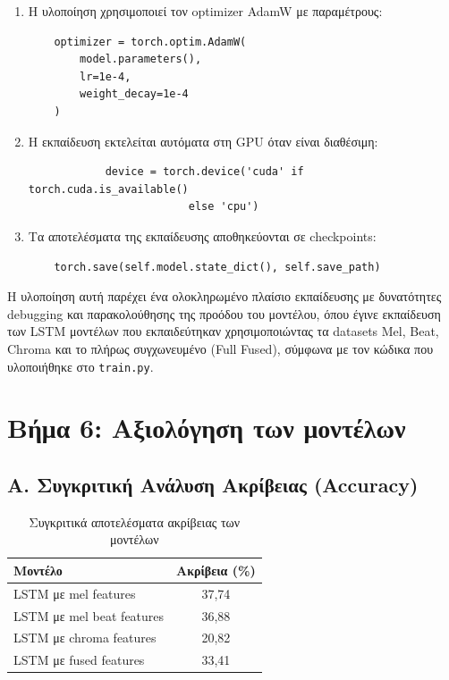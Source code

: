 \documentclass[a4paper,12pt]{article}
\begin{document}
\begin{enumerate}
    \item Η υλοποίηση χρησιμοποιεί τον optimizer AdamW με παραμέτρους:
          \begin{verbatim}
    optimizer = torch.optim.AdamW(
        model.parameters(), 
        lr=1e-4, 
        weight_decay=1e-4
    )
    \end{verbatim}

    \item Η εκπαίδευση εκτελείται αυτόματα στη GPU όταν είναι διαθέσιμη:
    \begin{verbatim}
            device = torch.device('cuda' if torch.cuda.is_available() 
                         else 'cpu')
    \end{verbatim}

    \item Τα αποτελέσματα της εκπαίδευσης αποθηκεύονται σε checkpoints:
          \begin{verbatim}
    torch.save(self.model.state_dict(), self.save_path)
    \end{verbatim}
\end{enumerate}

Η υλοποίηση αυτή παρέχει ένα ολοκληρωμένο πλαίσιο εκπαίδευσης με δυνατότητες debugging και παρακολούθησης της προόδου του μοντέλου,
όπου έγινε εκπαίδευση των LSTM μοντέλων που εκπαιδεύτηκαν χρησιμοποιώντας τα datasets Mel, Beat, Chroma και το πλήρως συγχωνευμένο (Full Fused), σύμφωνα με τον κώδικα που υλοποιήθηκε στο \verb|train.py|.

\section*{Βήμα 6: Αξιολόγηση των μοντέλων}

\subsection*{Α. Συγκριτική Ανάλυση Ακρίβειας (Accuracy)}

\begin{table}[H]
    \centering
    \begin{tabular}{lc}
    \toprule
    \textbf{Μοντέλο} & \textbf{Ακρίβεια (\%)} \\
    \midrule
    LSTM με mel features & 37,74 \\
    LSTM με mel beat features & 36,88 \\
    LSTM με chroma features & 20,82 \\
    LSTM με fused features & 33,41 \\
    \bottomrule
    \end{tabular}
    \caption{Συγκριτικά αποτελέσματα ακρίβειας των μοντέλων}
\end{table}
\end{document}
